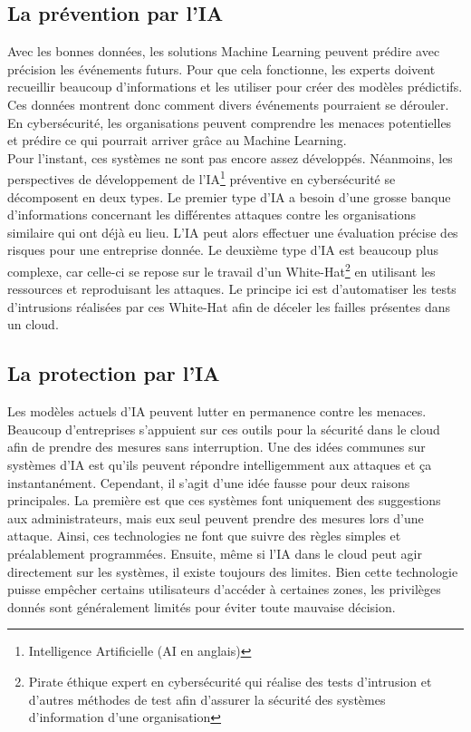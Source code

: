 \documentclass[a4paper, 12pt]{article}
\begin{document}
    \subsection{La prévention par l'IA}
      Avec les bonnes données, les solutions Machine Learning peuvent
      prédire avec précision les événements futurs. Pour que cela fonctionne,
      les experts doivent recueillir beaucoup d'informations et les utiliser
      pour créer des modèles prédictifs. Ces données montrent donc comment
      divers événements pourraient se dérouler. En cybersécurité, les
      organisations peuvent comprendre les menaces potentielles et prédire ce
      qui pourrait arriver grâce au Machine Learning. \\

      Pour l’instant, ces systèmes ne sont pas encore assez développés.
      Néanmoins, les perspectives de développement de l’IA\footnote{Intelligence
      Artificielle (AI en anglais)} préventive en cybersécurité se décomposent
      en deux types. Le premier type d'IA a besoin d’une grosse banque
      d'informations concernant les différentes attaques contre les
      organisations similaire qui ont déjà eu lieu. L'IA peut alors effectuer
      une évaluation précise des risques pour une entreprise donnée. Le deuxième
      type d’IA est beaucoup plus complexe, car celle-ci se repose sur le
      travail d’un White-Hat\footnote{Pirate éthique expert en cybersécurité qui
      réalise des tests d'intrusion et d'autres méthodes de test afin d'assurer
      la sécurité des systèmes d'information d'une organisation} en utilisant
      les ressources et reproduisant les attaques. Le principe ici est
      d’automatiser les tests d’intrusions réalisées par ces White-Hat afin de
      déceler les failles présentes dans un cloud.

    \subsection{La protection par l'IA}
      Les modèles actuels d'IA peuvent lutter en permanence contre les
      menaces. Beaucoup d’entreprises s'appuient sur ces outils pour la sécurité
      dans le cloud afin de prendre des mesures sans interruption. Une des idées
      communes sur systèmes d'IA est qu'ils peuvent répondre intelligemment aux
      attaques et ça instantanément. Cependant, il s'agit d'une idée fausse pour
      deux raisons principales. La première est que ces systèmes font uniquement
      des suggestions aux administrateurs, mais eux seul peuvent prendre des
      mesures lors d'une attaque. Ainsi, ces technologies ne font que suivre des
      règles simples et préalablement programmées. Ensuite, même si l’IA dans le
      cloud peut agir directement sur les systèmes, il existe toujours des
      limites. Bien cette technologie puisse empêcher certains utilisateurs
      d'accéder à certaines zones, les privilèges donnés sont généralement
      limités pour éviter toute mauvaise décision. \\
\end{document}
